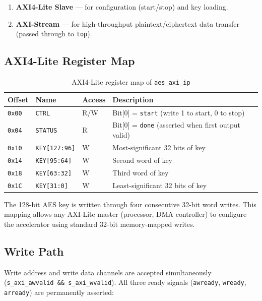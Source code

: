 \documentclass[12pt,a4paper]{article}
\begin{document}
\begin{enumerate}[nosep]
  \item \textbf{AXI4-Lite Slave} --- for configuration (start/stop) and key
        loading.
  \item \textbf{AXI-Stream} --- for high-throughput plaintext/ciphertext data
        transfer (passed through to \texttt{top}).
\end{enumerate}

\subsection{AXI4-Lite Register Map}

\begin{table}[H]
\centering
\begin{tabular}{@{}llll@{}}
\toprule
\textbf{Offset} & \textbf{Name} & \textbf{Access} & \textbf{Description}\\
\midrule
\texttt{0x00} & \texttt{CTRL}     & R/W & Bit[0] = \texttt{start} (write 1 to start, 0 to stop)\\
\texttt{0x04} & \texttt{STATUS}   & R   & Bit[0] = \texttt{done} (asserted when first output valid)\\
\texttt{0x10} & \texttt{KEY[127:96]} & W & Most-significant 32 bits of key\\
\texttt{0x14} & \texttt{KEY[95:64]}  & W & Second word of key\\
\texttt{0x18} & \texttt{KEY[63:32]}  & W & Third word of key\\
\texttt{0x1C} & \texttt{KEY[31:0]}   & W & Least-significant 32 bits of key\\
\bottomrule
\end{tabular}
\caption{AXI4-Lite register map of \texttt{aes\_axi\_ip}}
\end{table}

The 128-bit AES key is written through four consecutive 32-bit word writes.
This mapping allows any AXI-Lite master (processor, DMA controller) to
configure the accelerator using standard 32-bit memory-mapped writes.

\subsection{Write Path}

Write address and write data channels are accepted simultaneously
(\texttt{s\_axi\_awvalid \&\& s\_axi\_wvalid}). All three ready signals
(\texttt{awready}, \texttt{wready}, \texttt{arready}) are permanently
asserted:
\end{document}

